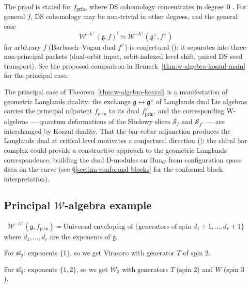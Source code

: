 \begin{remark}
\label{rem:w-koszul-general-nilpotent}
The proof is stated for $f_{\mathrm{prin}}$, where DS cohomology concentrates in degree~$0$ \cite{FF}.  For general $f$, DS cohomology may be non-trivial in other degrees, and the general case
\[
\mathcal{W}^{-h^\vee}(\mathfrak{g}, f)^! \simeq \mathcal{W}^{-h^\vee}(\mathfrak{g}^\vee, f^\vee)
\]
for arbitrary $f$ (Barbasch--Vogan dual $f^\vee$) is conjectural (\ClaimStatusConjectured): it separates into three non-principal packets (dual-orbit input, orbit-indexed level shift, paired DS seed transport).  See the proposed comparison in Remark~\ref{thm:w-algebra-koszul-main} for the principal case.
\end{remark}

\begin{remark}
The principal case of Theorem~\ref{thm:w-algebra-koszul} is a manifestation of geometric Langlands duality: the exchange $\mathfrak{g} \leftrightarrow \mathfrak{g}^\vee$ of Langlands dual Lie algebras carries the principal nilpotent $f_{\mathrm{prin}}$ to its dual $f^\vee_{\mathrm{prin}}$, and the corresponding W-algebras --- quantum deformations of the Slodowy slices $\mathcal{S}_f$ and $\mathcal{S}_{f^\vee}$ --- are interchanged by Koszul duality.  That the bar-cobar adjunction produces the Langlands dual at critical level motivates a conjectural direction (\ClaimStatusConjectured): the chiral bar complex could provide a constructive approach to the geometric Langlands correspondence, building the dual D-modules on $\mathrm{Bun}_G$ from configuration space data on the curve (see \S\ref{sec:km-conformal-blocks} for the conformal block interpretation).
\end{remark}

\subsection{Principal $\mathcal{W}$-algebra example}

\begin{theorem}
\label{thm:principal-w-algebra-structure}
\begin{equation}
\mathcal{W}^{-h^\vee}(\mathfrak{g}, f_{\mathrm{prin}}) = \text{Universal enveloping of } \{\text{generators of spin } d_1+1, \ldots, d_r+1\}
\end{equation}
where $d_1, \ldots, d_r$ are the exponents of $\mathfrak{g}$.

For $\mathfrak{sl}_2$: exponents $\{1\}$, so we get Virasoro with generator $T$ of spin $2$.

For $\mathfrak{sl}_3$: exponents $\{1,2\}$, so we get $\mathcal{W}_3$ with generators $T$ (spin $2$) and $W$ (spin $3$).
\end{theorem}

